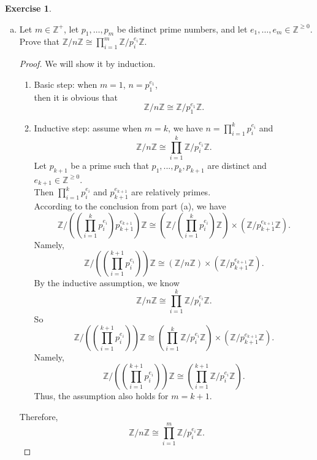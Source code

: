 \documentclass{article}
\newcommand{\bbz}{\mathbb{Z}}
\theoremstyle{plain}
\theoremstyle{definition}
\newtheorem{exer}[lem]{Exercise}
\begin{document}
\begin{exer}
\begin{enumerate}[(a)]
\item Let $m\in\bbz^+$, let $p_1,\ldots,p_m$ be distinct prime numbers, and let $e_1,\ldots,e_m\in\bbz^{\geq 0}$.
Prove that
$\bbz/n\bbz\cong\prod_{i=1}^m\bbz/p_i^{e_i}\bbz$.
\begin{proof}
We will show it by induction.
\begin{enumerate}[(1)]
	\item
		Basic step: when $m=1$, $n=p_1^{e_1}$, \\
		then it is obvious that 
		\[ \bbz / n\bbz \cong \bbz/p_1^{e_1}\bbz.\]
	\item
	  Inductive step: assume when $m=k$, we have $n = \prod_{i=1}^kp_i^{e_i}$ and 
	  \[ \bbz / n\bbz \cong \prod_{i=1}^k\bbz/p_i^{e_i}\bbz.\]
	  Let $p_{k+1}$ be a prime such that $p_1,...,p_k,p_{k+1}$ are distinct and $e_{k+1} \in \bbz^{\geq 0}$.\\
	  Then $\prod_{i=1}^kp_i^{e_i}$ and $p_{k+1}^{e_{k+1}}$ are relatively primes.\\
	  According to the conclusion from part (a), we have 
	  \[\bbz/ \left(\left( \prod_{i=1}^kp_i^{e_i} \right) p_{k+1}^{e_{k+1}} \right)\bbz\cong \left(\bbz/\left( \prod_{i=1}^kp_i^{e_i} \right) \bbz \right)\times \left(\bbz/ p_{k+1}^{e_{k+1}} \bbz\right).\]
	  Namely,
	\[\bbz/ \left(\left( \prod_{i=1}^{k+1}p_i^{e_i} \right) \right)\bbz\cong ( \bbz /n\bbz )\times \left(\bbz/ p_{k+1}^{e_{k+1}} \bbz\right).\]
	  By the inductive assumption, we know
	  \[ \bbz / n\bbz \cong \prod_{i=1}^k\bbz/p_i^{e_i}\bbz.\]
	  So
	  \[\bbz/ \left(\left( \prod_{i=1}^{k+1}p_i^{e_i} \right) \right)\bbz\cong \left( \prod_{i=1}^k\bbz/p_i^{e_i}\bbz \right)\times \left(\bbz/ p_{k+1}^{e_{k+1}} \bbz\right).\]
	  Namely,
	  \[\bbz/ \left(\left( \prod_{i=1}^{k+1}p_i^{e_i} \right) \right)\bbz\cong \left( \prod_{i=1}^{k+1}\bbz/p_i^{e_i}\bbz \right).\] 
	  Thus, the assumption also holds for $m=k+1$.\\ 
\end{enumerate}
    Therefore,
	\[ \bbz/n\bbz\cong\prod_{i=1}^m\bbz/p_i^{e_i}\bbz.\]
\end{proof}

\end{enumerate}
\end{exer}
\end{document}
